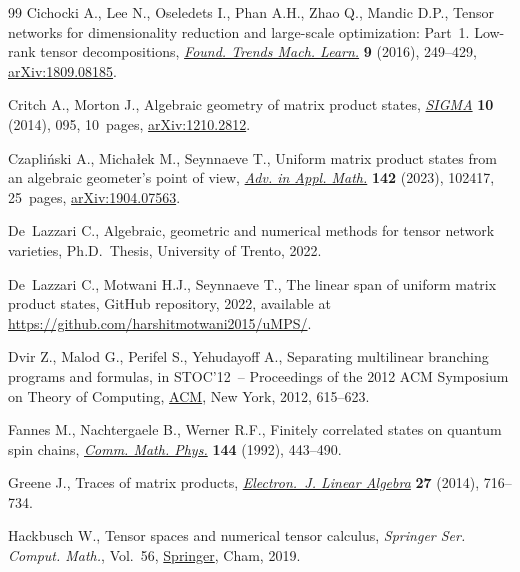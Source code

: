 \documentclass[10pt,a4paper]{amsart}
\numberwithin{equation}{section}
\begin{document}
\begin{thebibliography}{99}
Cichocki A., Lee N., Oseledets I., Phan A.H., Zhao Q., Mandic D.P., Tensor
  networks for dimensionality reduction and large-scale optimization: Part~1. Low-rank tensor decompositions, \href{http://doi.org/10.1561/2200000059}{\textit{Found. Trends Mach. Learn.}} \textbf{9} (2016), 249--429, \href{https://arxiv.org/abs/1809.08185}{arXiv:1809.08185}.

Critch A., Morton J., Algebraic geometry of matrix product states,
  \href{https://doi.org/10.3842/SIGMA.2014.095}{\textit{SIGMA}} \textbf{10} (2014), 095, 10~pages, \href{https://arxiv.org/abs/1210.2812}{arXiv:1210.2812}.

Czapli\'nski A., Micha{\l}ek M., Seynnaeve T., Uniform matrix product states
  from an algebraic geometer's point of view, \href{https://doi.org/10.1016/j.aam.2022.102417}{\textit{Adv. in Appl. Math.}}
  \textbf{142} (2023), 102417, 25~pages, \href{https://arxiv.org/abs/1904.07563}{arXiv:1904.07563}.

De~Lazzari C., Algebraic, geometric and numerical methods for tensor network
  varieties, Ph.D.~Thesis, {U}niversity of Trento, 2022.

De~Lazzari C., Motwani H.J., Seynnaeve T., The linear span of uniform matrix
  product states, {GitHub} repository, 2022, available at
  \url{https://github.com/harshitmotwani2015/uMPS/}.

Dvir Z., Malod G., Perifel S., Yehudayoff A., Separating multilinear branching
  programs and formulas, in S{TOC}'12~-- {P}roceedings of the 2012 {ACM}
  {S}ymposium on {T}heory of {C}omputing, \href{https://doi.org/10.1145/2213977.2214034}{ACM}, New York, 2012, 615--623.

Fannes M., Nachtergaele B., Werner R.F., Finitely correlated states on quantum
  spin chains, \href{https://doi.org/10.1007/BF02099178}{\textit{Comm. Math. Phys.}} \textbf{144} (1992), 443--490.

Greene J., Traces of matrix products, \href{https://doi.org/10.13001/1081-3810.1999}{\textit{Electron.~J. Linear Algebra}}
  \textbf{27} (2014), 716--734.

Hackbusch W., Tensor spaces and numerical tensor calculus, \textit{Springer
  Ser. Comput. Math.}, Vol.~56, \href{https://doi.org/10.1007/978-3-030-35554-8}{Springer}, Cham, 2019.


\end{thebibliography}
\end{document}
